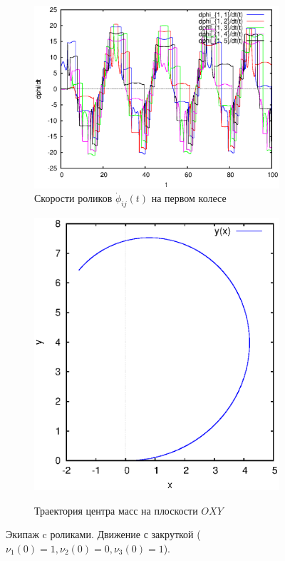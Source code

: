 \begin{figure}[H]
    \begin{subfigure}[t]{0.45\textwidth}
        \centering
        \includegraphics[width=\linewidth]{pic/rol__wrench__velocities_of_rollers_of_wheel_1}
        \caption{Скорости роликов $\dot{\phi}_{ij}(t)$ на первом колесе}
        \label{fig:rol__wrench__velocities_of_rollers_of_wheel_1}    
    \end{subfigure}
    \hfill
    \begin{subfigure}[t]{0.45\textwidth}
        \centering
        \includegraphics[width=\linewidth]{pic/rol__wrench__trajectory} \\
        \caption{Траектория центра масс на плоскости $OXY$}
        \label{fig:rol__wrench__trajectory}
    \end{subfigure}
    
    \caption{Экипаж c роликами. Движение с закруткой ($\nu_1(0) = 1, \nu_2(0) = 0, \nu_3(0) = 1$).}
    \label{fig:wrench}
    
\end{figure}
